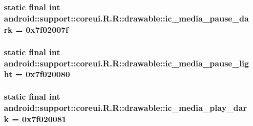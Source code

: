 \hypertarget{classandroid_1_1support_1_1coreui_1_1_r_1_1drawable_ff3fddb82cfee05a7cb942ac00f9f92c}{
\subsubsection[{ic\_\-media\_\-pause\_\-dark}]{\setlength{\rightskip}{0pt plus 5cm}static final int android::support::coreui.R.R::drawable::ic\_\-media\_\-pause\_\-dark = 0x7f02007f}}
\label{classandroid_1_1support_1_1coreui_1_1_r_1_1drawable_ff3fddb82cfee05a7cb942ac00f9f92c}


\hypertarget{classandroid_1_1support_1_1coreui_1_1_r_1_1drawable_2f02c0d38b1443a362ded7dff813fc2d}{
\subsubsection[{ic\_\-media\_\-pause\_\-light}]{\setlength{\rightskip}{0pt plus 5cm}static final int android::support::coreui.R.R::drawable::ic\_\-media\_\-pause\_\-light = 0x7f020080}}
\label{classandroid_1_1support_1_1coreui_1_1_r_1_1drawable_2f02c0d38b1443a362ded7dff813fc2d}


\hypertarget{classandroid_1_1support_1_1coreui_1_1_r_1_1drawable_fcdc6c28da331237cf4ea171ac8c6730}{
\subsubsection[{ic\_\-media\_\-play\_\-dark}]{\setlength{\rightskip}{0pt plus 5cm}static final int android::support::coreui.R.R::drawable::ic\_\-media\_\-play\_\-dark = 0x7f020081}}
\label{classandroid_1_1support_1_1coreui_1_1_r_1_1drawable_fcdc6c28da331237cf4ea171ac8c6730}


